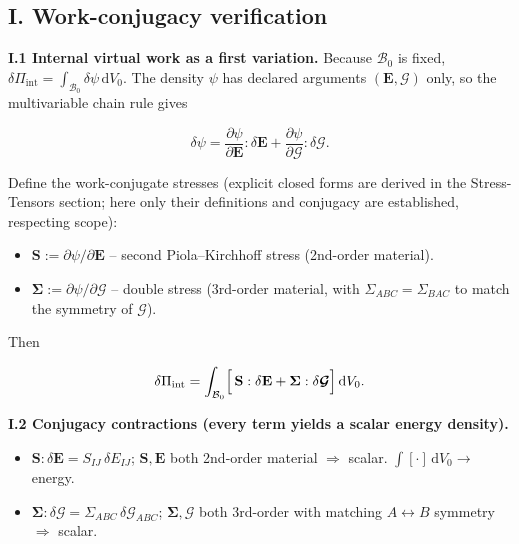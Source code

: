 \documentclass[11pt]{article}
\begin{document}
\subsection{I. Work-conjugacy verification}

\textbf{I.1 Internal virtual work as a first variation.} Because $\mathcal{B}_{0}$ is fixed, $\delta\Pi_{\mathrm{int}}=\int_{\mathcal{B}_{0}}\delta\psi\,\mathrm{d}V_{0}$. The density $\psi$ has declared arguments $(\mathbf{E},\bm{\mathcal{G}})$ only, so the multivariable chain rule gives

\begin{equation}
\delta\psi
= \frac{\partial\psi}{\partial\mathbf{E}}:\delta\mathbf{E}
+ \frac{\partial\psi}{\partial\bm{\mathcal{G}}}:\delta\bm{\mathcal{G}}.
\label{rn:dpsi}
\end{equation}

Define the work-conjugate stresses (explicit closed forms are derived in the Stress-Tensors section; here only their definitions and conjugacy are established, respecting scope):

\begin{itemize}
\item $\mathbf{S}:=\partial\psi/\partial\mathbf{E}$ -- second Piola--Kirchhoff stress (2nd-order material).

\item $\boldsymbol{\Sigma}:=\partial\psi/\partial\bm{\mathcal{G}}$ -- double stress (3rd-order material, with $\Sigma_{ABC}=\Sigma_{BAC}$ to match the symmetry of $\bm{\mathcal{G}}$).
\end{itemize}

Then

\begin{equation}
\delta\Pi_{\mathrm{int}}
= \int_{\mathcal{B}_{0}}
  \Bigl[\,\mathbf{S}:\delta\mathbf{E}
        +\boldsymbol{\Sigma}:\delta\bm{\mathcal{G}}\Bigr]\,
  \mathrm{d}V_{0}.
\label{rn:Wint}
\end{equation}

\textbf{I.2 Conjugacy contractions (every term yields a scalar energy density).}

\begin{itemize}
\item $\mathbf{S}:\delta\mathbf{E}=S_{IJ}\,\delta E_{IJ}$; $\mathbf{S},\mathbf{E}$ both 2nd-order material $\Rightarrow$ scalar. $\int[\cdot]\,\mathrm{d}V_{0}\to$ energy. \checkmark

\item $\boldsymbol{\Sigma}:\delta\bm{\mathcal{G}}=\Sigma_{ABC}\,\delta\mathcal{G}_{ABC}$; $\boldsymbol{\Sigma},\bm{\mathcal{G}}$ both 3rd-order with matching $A\leftrightarrow B$ symmetry $\Rightarrow$ scalar. \checkmark
\end{itemize}
\end{document}
